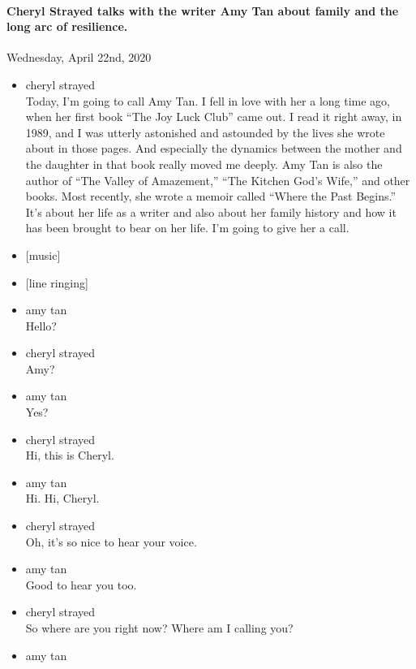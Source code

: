 \hypertarget{cheryl-strayed-talks-with-the-writer-amy-tan-about-family-and-the-long-arc-of-resilience}{%
\paragraph{Cheryl Strayed talks with the writer Amy Tan about family and
the long arc of
resilience.}\label{cheryl-strayed-talks-with-the-writer-amy-tan-about-family-and-the-long-arc-of-resilience}}

Wednesday, April 22nd, 2020

\begin{itemize}
\item
  cheryl strayed\\
  Today, I'm going to call Amy Tan. I fell in love with her a long time
  ago, when her first book ``The Joy Luck Club'' came out. I read it
  right away, in 1989, and I was utterly astonished and astounded by the
  lives she wrote about in those pages. And especially the dynamics
  between the mother and the daughter in that book really moved me
  deeply. Amy Tan is also the author of ``The Valley of Amazement,''
  ``The Kitchen God's Wife,'' and other books. Most recently, she wrote
  a memoir called ``Where the Past Begins.'' It's about her life as a
  writer and also about her family history and how it has been brought
  to bear on her life. I'm going to give her a call.
\item
  {[}music{]}
\item
  {[}line ringing{]}
\item
  amy tan\\
  Hello?
\item
  cheryl strayed\\
  Amy?
\item
  amy tan\\
  Yes?
\item
  cheryl strayed\\
  Hi, this is Cheryl.
\item
  amy tan\\
  Hi. Hi, Cheryl.
\item
  cheryl strayed\\
  Oh, it's so nice to hear your voice.
\item
  amy tan\\
  Good to hear you too.
\item
  cheryl strayed\\
  So where are you right now? Where am I calling you?
\item
  amy tan\\

\end{itemize}
